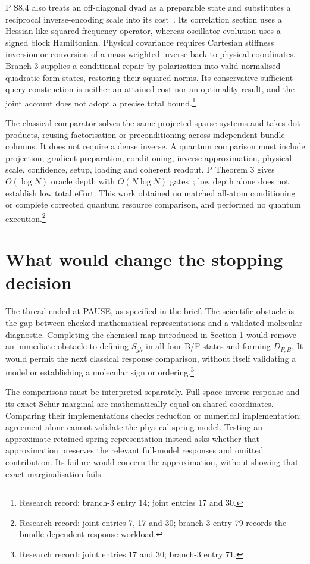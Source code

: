 \documentclass{article}
\begin{document}
P S8.4 also treats an off-diagonal dyad as a preparable state and substitutes a reciprocal inverse-encoding scale into its cost~\cite{P}. Its correlation section uses a Hessian-like squared-frequency operator, whereas oscillator evolution uses a signed block Hamiltonian. Physical covariance requires Cartesian stiffness inversion or conversion of a mass-weighted inverse back to physical coordinates. Branch 3 supplies a conditional repair by polarisation into valid normalised quadratic-form states, restoring their squared norms. Its conservative sufficient query construction is neither an attained cost nor an optimality result, and the joint account does not adopt a precise total bound.\footnote{Research record: branch-3 entry 14; joint entries 17 and 30.}

The classical comparator solves the same projected sparse systems and takes dot products, reusing factorisation or preconditioning across independent bundle columns. It does not require a dense inverse. A quantum comparison must include projection, gradient preparation, conditioning, inverse approximation, physical scale, confidence, setup, loading and coherent readout. P Theorem 3 gives \(O(\log N)\) oracle depth with \(O(N\log N)\) gates~\cite{P}; low depth alone does not establish low total effort. This work obtained no matched all-atom conditioning or complete corrected quantum resource comparison, and performed no quantum execution.\footnote{Research record: joint entries 7, 17 and 30; branch-3 entry 79 records the bundle-dependent response workload.}

\section{What would change the stopping decision}
The thread ended at PAUSE, as specified in the brief. The scientific obstacle is the gap between checked mathematical representations and a validated molecular diagnostic. Completing the chemical map introduced in Section 1 would remove an immediate obstacle to defining \(S_{gh}\) in all four B/F states and forming \(D_{F;B}\). It would permit the next classical response comparison, without itself validating a model or establishing a molecular sign or ordering.\footnote{Research record: joint entries 17 and 30; branch-3 entry 71.}

The comparisons must be interpreted separately. Full-space inverse response and its exact Schur marginal are mathematically equal on shared coordinates. Comparing their implementations checks reduction or numerical implementation; agreement alone cannot validate the physical spring model. Testing an approximate retained spring representation instead asks whether that approximation preserves the relevant full-model responses and omitted contribution. Its failure would concern the approximation, without showing that exact marginalisation fails.
\end{document}
